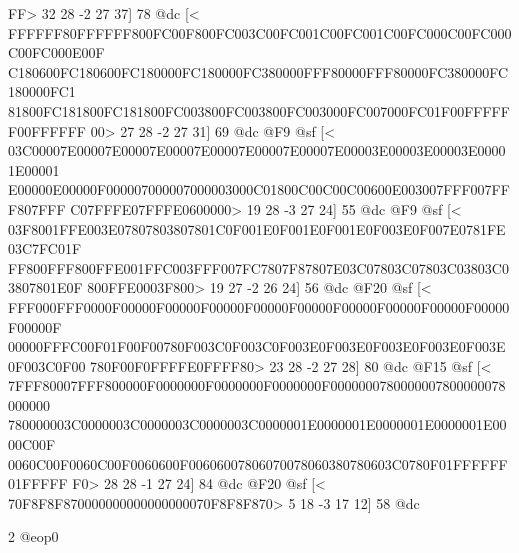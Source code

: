 {FF>
	 32 28 -2 27 37] 78 @dc
[<
FFFFFF80FFFFFF800FC00F800FC003C00FC001C00FC001C00FC000C00FC000C00FC000E00F
C180600FC180600FC180000FC180000FC380000FFF80000FFF80000FC380000FC180000FC1
81800FC181800FC181800FC003800FC003800FC003000FC007000FC01F00FFFFFF00FFFFFF
00>
	 27 28 -2 27 31] 69 @dc
@F9 @sf
[<
03C00007E00007E00007E00007E00007E00007E00007E00003E00003E00003E00001E00001
E00000E00000F000007000007000003000C01800C00C00C00600E003007FFF007FFF807FFF
C07FFFE07FFFE0600000>
	 19 28 -3 27 24] 55 @dc
@F9 @sf
[<
03F8001FFE003E07807803807801C0F001E0F001E0F001E0F003E0F007E0781FE03C7FC01F
FF800FFF800FFE001FFC003FFF007FC7807F87807E03C07803C07803C03803C03807801E0F
800FFE0003F800>
	 19 27 -2 26 24] 56 @dc
@F20 @sf
[<
FFF000FFF0000F00000F00000F00000F00000F00000F00000F00000F00000F00000F00000F
00000FFFC00F01F00F00780F003C0F003C0F003E0F003E0F003E0F003E0F003E0F003C0F00
780F00F0FFFFE0FFFF80>
	 23 28 -2 27 28] 80 @dc
@F15 @sf
[<
7FFF80007FFF800000F0000000F0000000F0000000F0000000780000007800000078000000
780000003C0000003C0000003C0000003C0000001E0000001E0000001E0000001E0000C00F
0060C00F0060C00F0060600F00606007806070078060380780603C0780F01FFFFFF01FFFFF
F0>
	 28 28 -1 27 24] 84 @dc
@F20 @sf
[<
70F8F8F870000000000000000070F8F8F870>
	 5 18 -3 17 12] 58 @dc

2 @eop0

}
